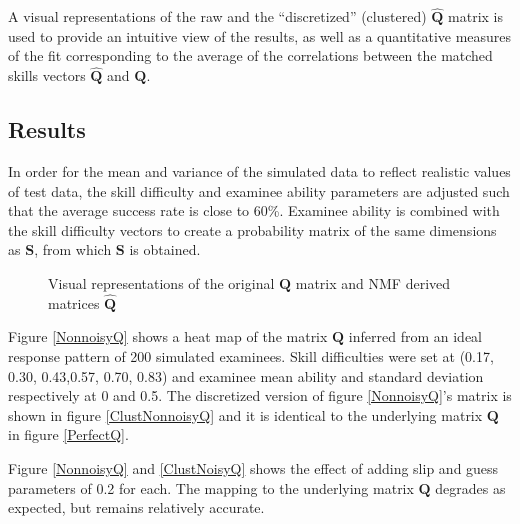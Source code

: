 A visual representations of the raw and the \textquotedblleft{}discretized\textquotedblright{} (clustered) $\hat{\mathbf{Q}}$ matrix is used to provide an intuitive view of the results, as well as a quantitative measures of the fit corresponding to the average of the correlations between the matched skills vectors $\hat{\mathbf{Q}}$ and $\mathbf{Q}$.


\subsection{Results}


In order for the mean and variance of the simulated data to reflect realistic values of test data, the skill difficulty and examinee ability parameters are adjusted such that the average success rate is close to 60\%. Examinee ability is combined with the skill difficulty vectors to create a probability matrix of the same dimensions as $\mathbf{S}$, from which $\mathbf{S}$ is obtained.


\begin{figure}[!h]
\centering

\quad
\centering
{}\quad
\caption{Visual representations of the original $\mathbf{Q}$ matrix and NMF derived matrices $\hat{\mathbf{Q}}$}
\label{ClusteringResults}
\end{figure}


Figure \ref{NonnoisyQ} shows a heat map of the matrix $\mathbf{Q}$ inferred from an ideal response pattern of 200 simulated examinees. Skill difficulties were set at (0.17, 0.30, 0.43,0.57, 0.70, 0.83) and examinee mean ability and standard deviation respectively at 0 and 0.5. The discretized version of figure \ref{NonnoisyQ}\textquoteright{}s matrix is shown in figure \ref{ClustNonnoisyQ} and it is identical to the underlying matrix $\mathbf{Q}$ in figure \ref{PerfectQ}.

Figure \ref{NonnoisyQ} and \ref{ClustNoisyQ} shows the effect of adding slip and guess parameters of 0.2 for each. The mapping to the underlying matrix $\mathbf{Q}$ degrades as expected, but remains relatively accurate.

